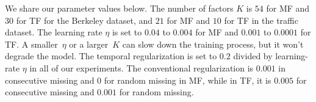 %


We share our parameter values below.
The number of factors $K$ is $54$ for MF and $30$ for TF for the Berkeley dataset, and $21$ for MF and $10$ for TF in the traffic dataset. 
The learning rate $\eta$ is set to $0.04$ to $0.004$ for MF and $0.001$ to $0.0001$ for TF.
A smaller~$\eta$ or a larger~$K$ can slow down the training process, but it won't degrade the model.
The temporal regularization is set to $0.2$ divided by learning-rate $\eta$ in all of our experiments.
The conventional regularization is $0.001$ in consecutive missing and $0$ for random missing in MF, while in TF, it is $0.005$ for consecutive missing and $0.001$ for random missing.


